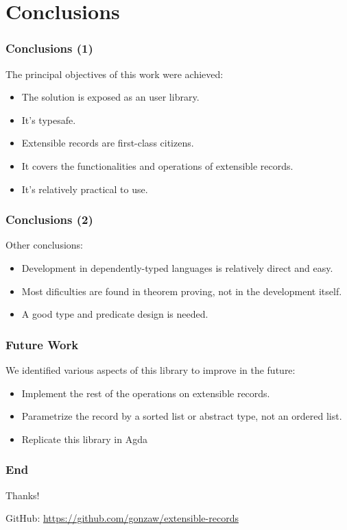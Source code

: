 \documentclass{beamer}
\begin{document}
\section{Conclusions}

\begin{frame}
\frametitle{Conclusions (1)}

The principal objectives of this work were achieved:

\begin{itemize}
\item The solution is exposed as an user library.
\item It's typesafe.
\item Extensible records are first-class citizens.
\item It covers the functionalities and operations of extensible records.
\item It's relatively practical to use.
\end{itemize}

\end{frame}

\begin{frame}
\frametitle{Conclusions (2)}

Other conclusions:

\begin{itemize}
\item Development in dependently-typed languages is relatively direct and easy.
\item Most dificulties are found in theorem proving, not in the development itself.
\item A good type and predicate design is needed.
\end{itemize}

\end{frame}

\begin{frame}
\frametitle{Future Work}

We identified various aspects of this library to improve in the future:

\begin{itemize}
\item Implement the rest of the operations on extensible records.
\item Parametrize the record by a sorted list or abstract type, not an ordered list.
\item Replicate this library in Agda
\end{itemize}

\end{frame}

\begin{frame}
\frametitle{End}

\begin{center}
{\huge Thanks!}
\end{center}

\vfill

\vfill

\begin{center}
GitHub: \url{https://github.com/gonzaw/extensible-records}
\end{center}

\end{frame}
\end{document}
